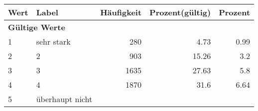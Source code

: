      \begin{longtable}{lXrrr}
     \toprule
     \textbf{Wert} & \textbf{Label} & \textbf{Häufigkeit} & \textbf{Prozent(gültig)} & \textbf{Prozent} \\
     \endhead
     \midrule
     \multicolumn{5}{l}{\textbf{Gültige Werte}}\\

     1 &
     \multicolumn{1}{X}{ sehr stark   } &


       \num{280} &
       \num[round-mode=places,round-precision=2]{4.73} &
         \num[round-mode=places,round-precision=2]{0.99} \\

     2 &
     \multicolumn{1}{X}{ 2   } &


       \num{903} &
       \num[round-mode=places,round-precision=2]{15.26} &
         \num[round-mode=places,round-precision=2]{3.2} \\

     3 &
     \multicolumn{1}{X}{ 3   } &


       \num{1635} &
       \num[round-mode=places,round-precision=2]{27.63} &
         \num[round-mode=places,round-precision=2]{5.8} \\

     4 &
     \multicolumn{1}{X}{ 4   } &


       \num{1870} &
       \num[round-mode=places,round-precision=2]{31.6} &
         \num[round-mode=places,round-precision=2]{6.64} \\

     5 &
     \multicolumn{1}{X}{ überhaupt nicht   } &



\end{longtable}
